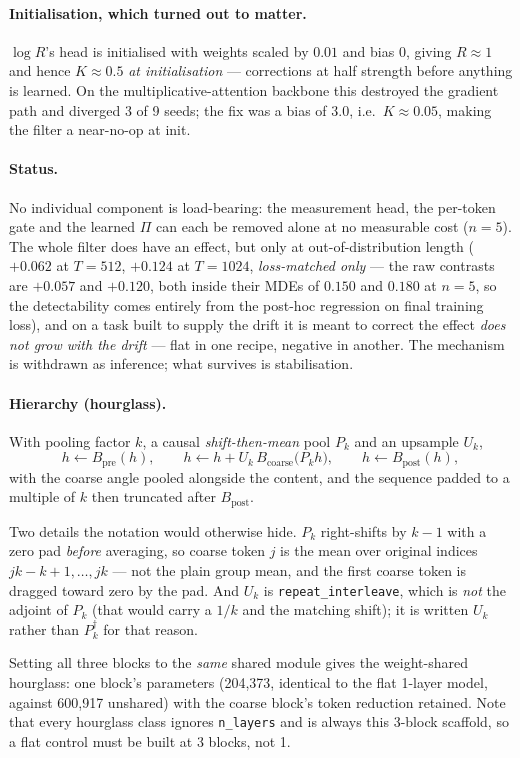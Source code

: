 \documentclass[11pt]{article}
\begin{document}
\paragraph{Initialisation, which turned out to matter.} $\log R$'s head is
initialised with weights scaled by $0.01$ and bias $0$, giving $R\approx 1$ and
hence $K \approx 0.5$ \emph{at initialisation} --- corrections at half strength
before anything is learned. On the multiplicative-attention backbone this destroyed
the gradient path and diverged 3 of 9 seeds; the fix was a bias of $3.0$, i.e.\
$K\approx 0.05$, making the filter a near-no-op at init.

\paragraph{Status.} No individual component is load-bearing: the measurement head,
the per-token gate and the learned $\Pi$ can each be removed alone at no measurable
cost ($n=5$). The whole filter does have an effect, but only at out-of-distribution
length ($+0.062$ at $T{=}512$, $+0.124$ at $T{=}1024$, \emph{loss-matched only} ---
the raw contrasts are $+0.057$ and $+0.120$, both inside their MDEs of $0.150$ and
$0.180$ at $n=5$, so the detectability comes entirely from the post-hoc regression
on final training loss), and on a task
built to supply the drift it is meant to correct the effect \emph{does not grow
with the drift} --- flat in one recipe, negative in another. The mechanism is
withdrawn as inference; what survives is stabilisation.

\paragraph{Hierarchy (hourglass).} With pooling factor $k$, a causal
\emph{shift-then-mean} pool $P_k$ and an upsample $U_k$,
\begin{equation}
  h \leftarrow B_{\mathrm{pre}}(h), \qquad
  h \leftarrow h + U_k\,B_{\mathrm{coarse}}\!\big(P_k h\big), \qquad
  h \leftarrow B_{\mathrm{post}}(h),
\end{equation}
with the coarse angle pooled alongside the content, and the sequence padded to a
multiple of $k$ then truncated after $B_{\mathrm{post}}$.

Two details the notation would otherwise hide. $P_k$ right-shifts by $k-1$ with a
zero pad \emph{before} averaging, so coarse token $j$ is the mean over original
indices $jk-k+1,\dots,jk$ --- not the plain group mean, and the first coarse token
is dragged toward zero by the pad. And $U_k$ is \texttt{repeat\_interleave}, which
is \emph{not} the adjoint of $P_k$ (that would carry a $1/k$ and the matching
shift); it is written $U_k$ rather than $P_k^{\dagger}$ for that reason.

Setting all three blocks to the \emph{same} shared module gives the weight-shared
hourglass: one block's parameters (204,373, identical to the flat 1-layer model,
against 600,917 unshared) with the coarse block's token reduction retained. Note
that every hourglass class ignores \texttt{n\_layers} and is always this 3-block
scaffold, so a flat control must be built at 3 blocks, not 1.
\end{document}
